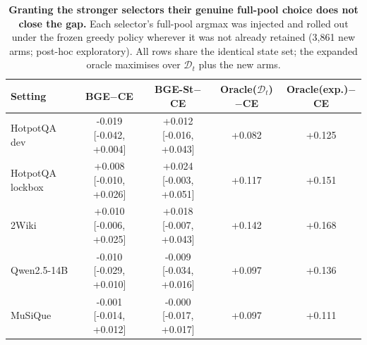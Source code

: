 \begin{table}[t]
\centering
\small
\caption{\textbf{Granting the stronger selectors their genuine
full-pool choice does not close the gap.} Each selector's full-pool
argmax was injected and rolled out under the frozen greedy policy
wherever it was not already retained (3{,}861 new arms; post-hoc
exploratory). All rows share the identical state set; the expanded
oracle maximises over $\mathcal{D}_t$ plus the new arms.}
\label{tab:expanded}
\begin{tabular}{lcccc}
\toprule
\textbf{Setting} & \textbf{BGE$-$CE} & \textbf{BGE-St$-$CE} & \textbf{Oracle($\mathcal{D}_t$)$-$CE} & \textbf{Oracle(exp.)$-$CE} \\
\midrule
HotpotQA dev & -0.019 [-0.042, +0.004] & +0.012 [-0.016, +0.043] & +0.082 & +0.125 \\
HotpotQA lockbox & +0.008 [-0.010, +0.026] & +0.024 [-0.003, +0.051] & +0.117 & +0.151 \\
2Wiki & +0.010 [-0.006, +0.025] & +0.018 [-0.007, +0.043] & +0.142 & +0.168 \\
Qwen2.5-14B & -0.010 [-0.029, +0.010] & -0.009 [-0.034, +0.016] & +0.097 & +0.136 \\
MuSiQue & -0.001 [-0.014, +0.012] & -0.000 [-0.017, +0.017] & +0.097 & +0.111 \\
\bottomrule
\end{tabular}
\end{table}
